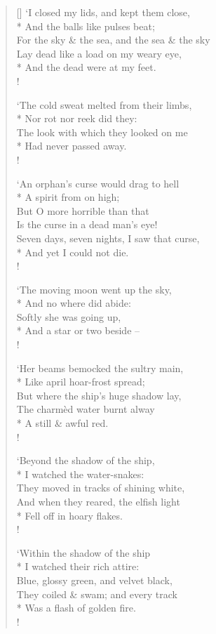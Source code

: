 \documentclass[MAIN]{subfiles}
\begin{document}
\begin{verse}[\versewidth]
`I closed my lids, and kept them close,\\*
\vin And the balls like pulses beat;\\
For the sky \& the sea, and the sea \& the sky\\
Lay dead like a load on my weary eye,\\*
\vin And the dead were at my feet.\\!

`The cold sweat melted from their limbs,\\*
\vin Nor rot nor reek did they:\\
The look with which they looked on me\\*
\vin Had never passed away.\\!

`An orphan's curse would drag to hell\\*
\vin A spirit from on high;\\
But O more horrible than that\\
\vin Is the curse in a dead man's eye!\\
Seven days, seven nights, I saw that curse,\\*
\vin And yet I could not die.\\!

`The moving moon went up the sky,\\*
\vin And no where did abide:\\
Softly she was going up,\\*
\vin And a star or two beside --\\!

`Her beams bemocked the sultry main,\\*
\vin Like april hoar-frost spread;\\
But where the ship's huge shadow lay,\\
The charm\`ed water burnt alway\\*
\vin A still \& awful red.\\!

`Beyond the shadow of the ship,\\*
\vin I watched the water-snakes:\\
They moved in tracks of shining white,\\
And when they reared, the elfish light\\*
\vin Fell off in hoary flakes.\\!

`Within the shadow of the ship\\*
\vin I watched their rich attire:\\
Blue, glossy green, and velvet black,\\
They coiled \& swam; and every track\\*
\vin Was a flash of golden fire.\\!


\end{verse}
\end{document}
